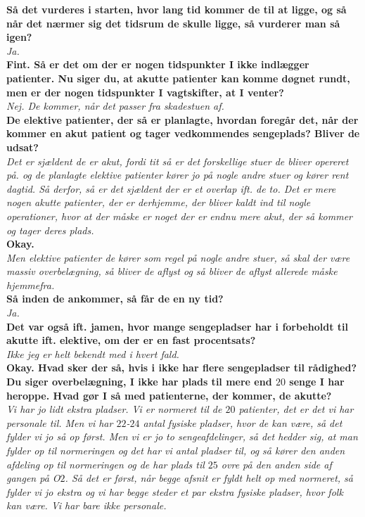 \noindent
\textbf{Så det vurderes i starten, hvor lang tid kommer de til at ligge, og så når det nærmer sig det tidsrum de skulle ligge, så vurderer man så igen?} \\
\noindent
\textit{Ja.} \\
\noindent
\textbf{Fint. Så er det om der er nogen tidspunkter I ikke indlægger patienter. Nu siger du, at akutte patienter kan komme døgnet rundt, men er der nogen tidspunkter I vagtskifter, at I venter?} \\
\noindent
\textit{Nej. De kommer, når det passer fra skadestuen af.} \\
\noindent
\textbf{De elektive patienter, der så er planlagte, hvordan foregår det, når der kommer en akut patient og tager vedkommendes sengeplads? Bliver de udsat?} \\
\noindent
\textit{Det er sjældent de er akut, fordi tit så er det forskellige stuer de bliver opereret på. og de planlagte elektive patienter kører jo på nogle andre stuer og kører rent dagtid. Så derfor, så er det sjældent der er et overlap ift. de to. Det er mere nogen akutte patienter, der er derhjemme, der bliver kaldt ind til nogle operationer, hvor at der måske er noget der er endnu mere akut, der så kommer og tager deres plads.} \\
\noindent
\textbf{Okay.} \\
\noindent
\textit{Men elektive patienter de kører som regel på nogle andre stuer, så skal der være massiv overbelægning, så bliver de aflyst og så bliver de aflyst allerede måske hjemmefra.} \\
\noindent
\textbf{Så inden de ankommer, så får de en ny tid?} \\
\noindent
\textit{Ja.} \\
\noindent
\textbf{Det var også ift. jamen, hvor mange sengepladser har i forbeholdt til akutte ift. elektive, om der er en fast procentsats?} \\
\noindent
\textit{Ikke jeg er helt bekendt med i hvert fald.} \\
\noindent
\textbf{Okay. Hvad sker der så, hvis i ikke har flere sengepladser til rådighed? Du siger overbelægning, I ikke har plads til mere end $20$ senge I har heroppe. Hvad gør I så med patienterne, der kommer, de akutte?} \\
\noindent
\textit{Vi har jo lidt ekstra pladser. Vi er normeret til de $20$ patienter, det er det vi har personale til. Men vi har $22$-$24$ antal fysiske pladser, hvor de kan være, så det fylder vi jo så op først. Men vi er jo to sengeafdelinger, så det hedder sig, at man fylder op til normeringen og det har vi antal pladser til, og så kører den anden afdeling op til normeringen og de har plads til $25$ ovre på den anden side af gangen på O$2$. Så det er først, når begge afsnit er fyldt helt op med normeret, så fylder vi jo ekstra og vi har begge steder et par ekstra fysiske pladser, hvor folk kan være. Vi har bare ikke personale.} \\
